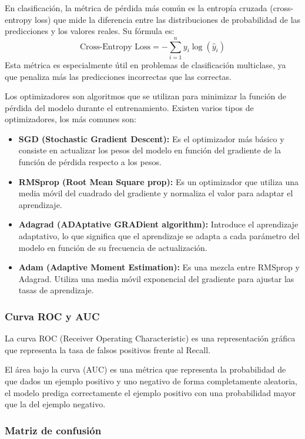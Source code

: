 En clasificación, la métrica de pérdida más común es la entropía cruzada (cross-entropy loss) que mide la diferencia entre las distribuciones de probabilidad de las predicciones y los valores reales. Su fórmula es: \begin{equation}
	\text{Cross-Entropy Loss} = -\sum_{i=1}^{n} y_i \log(\hat{y}_i)
\end{equation}
Esta métrica es especialmente útil en problemas de clasificación multiclase, ya que penaliza más las predicciones incorrectas que las correctas.

Los optimizadores son algoritmos que se utilizan para minimizar la función de pérdida del modelo durante el entrenamiento.
Existen varios tipos de optimizadores, los más comunes son:
\begin{itemize}
	\item \textbf{SGD (Stochastic Gradient Descent):} Es el optimizador más básico y consiste en actualizar los pesos del modelo en función del gradiente de la función de pérdida respecto a los pesos.
	\item \textbf{RMSprop (Root Mean Square prop):} Es un optimizador que utiliza una media móvil del cuadrado del gradiente y normaliza el valor para adaptar el aprendizaje.
	\item \textbf{Adagrad (ADAptative GRADient algorithm):} Introduce el aprendizaje adaptativo, lo que significa que el aprendizaje se adapta a cada parámetro del modelo en función de su frecuencia de actualización.
	\item \textbf{Adam (Adaptive Moment Estimation):} Es una mezcla entre RMSprop y Adagrad. Utiliza una media móvil exponencial del gradiente para ajustar las tasas de aprendizaje.
\end{itemize}

\subsubsection{Curva ROC y AUC}

La curva ROC\cite{google:roc_auc} (Receiver Operating Characteristic) es una representación gráfica que representa la tasa de falsos positivos frente al Recall.

El área bajo la curva (AUC) es una métrica que representa la probabilidad de que dados un ejemplo positivo y uno negativo de forma completamente aleatoria, el modelo prediga correctamente el ejemplo positivo con una probabilidad mayor que la del ejemplo negativo.
 
\subsubsection{Matriz de confusión}

